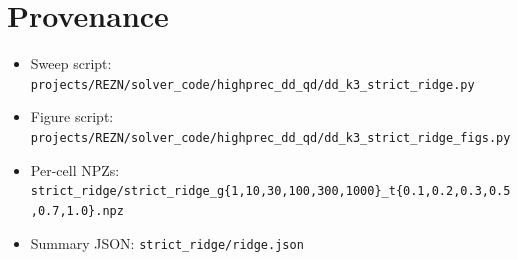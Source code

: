 \documentclass[11pt]{article}
\begin{document}
\section*{Provenance}
\begin{itemize}
  \item Sweep script:
        \texttt{projects/REZN/solver\_code/highprec\_dd\_qd/dd\_k3\_strict\_ridge.py}
  \item Figure script:
        \texttt{projects/REZN/solver\_code/highprec\_dd\_qd/dd\_k3\_strict\_ridge\_figs.py}
  \item Per-cell NPZs:
        \texttt{strict\_ridge/strict\_ridge\_g\{1,10,30,100,300,1000\}\_t\{0.1,0.2,0.3,0.5,0.7,1.0\}.npz}
  \item Summary JSON: \texttt{strict\_ridge/ridge.json}
\end{itemize}
\end{document}
